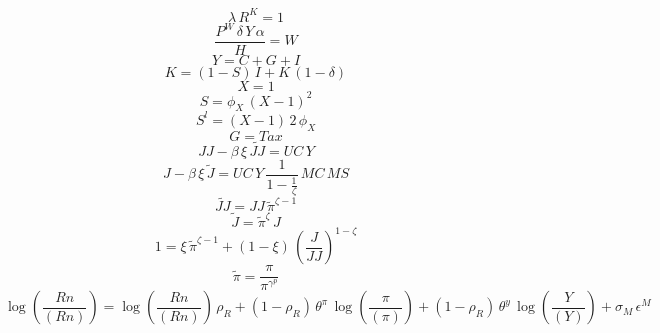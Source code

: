 \begin{dmath}
{\lambda}\, {R^{K}}=1
\end{dmath}
\begin{dmath}
\frac{{P^{W}}\, {\delta}\, {Y}\, {{\alpha}}}{{H}}={W}
\end{dmath}
\begin{dmath}
{Y}={C}+{G}+{I}
\end{dmath}
\begin{dmath}
{K}=\left(1-{S}\right)\, {I}+{K}\, \left(1-{{\delta}}\right)
\end{dmath}
\begin{dmath}
{X}=1
\end{dmath}
\begin{dmath}
{S}={{\phi_{X}}}\, \left({X}-1\right)^{2}
\end{dmath}
\begin{dmath}
{S^{l}}=\left({X}-1\right)\, 2\, {{\phi_{X}}}
\end{dmath}
\begin{dmath}
{G}={Tax}
\end{dmath}
\begin{dmath}
{JJ}-{{\beta}}\, {{\xi}}\, {\tilde{JJ}}={UC}\, {Y}
\end{dmath}
\begin{dmath}
{J}-{{\beta}}\, {{\xi}}\, {\tilde{J}}={UC}\, {Y}\, \frac{1}{1-\frac{1}{{{\zeta}}}}\, {MC}\, {MS}
\end{dmath}
\begin{dmath}
{\tilde{JJ}}={JJ}\, {\tilde{\pi}}^{{{\zeta}}-1}
\end{dmath}
\begin{dmath}
{\tilde{J}}={\tilde{\pi}}^{{{\zeta}}}\, {J}
\end{dmath}
\begin{dmath}
1={{\xi}}\, {\tilde{\pi}}^{{{\zeta}}-1}+\left(1-{{\xi}}\right)\, \left(\frac{{J}}{{JJ}}\right)^{1-{{\zeta}}}
\end{dmath}
\begin{dmath}
{\tilde{\pi}}=\frac{{\pi}}{{\pi}^{{{\gamma^{p}}}}}
\end{dmath}
\begin{dmath}
\log\left(\frac{{Rn}}{({Rn})}\right)=\log\left(\frac{{Rn}}{({Rn})}\right)\, {{\rho_{R}}}+\left(1-{{\rho_{R}}}\right)\, {\theta^{\pi}}\, \log\left(\frac{{\pi}}{({\pi})}\right)+\left(1-{{\rho_{R}}}\right)\, {\theta^{y}}\, \log\left(\frac{{Y}}{({Y})}\right)+{{\sigma_{M}}}\, {{\epsilon^{M}}}
\end{dmath}
